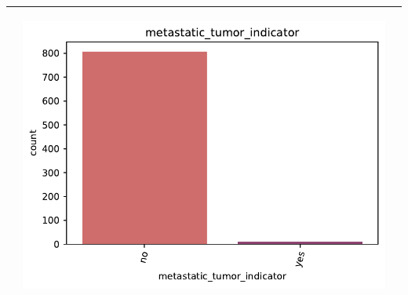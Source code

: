 \begin{table}[!htb]
\begin{threeparttable}
\begin{tabular}{p{2.5cm} p{7cm} p{6.5cm}}
			& \begin{center}\includegraphics[width=1\linewidth]{NOTEBOOK/IMAGENES_DESCRIPTIVAS/26_metastatic_tumor_indicator}\end{center}
			\\ \hline
		\end{tabular}
	\end{threeparttable}
\end{table}

